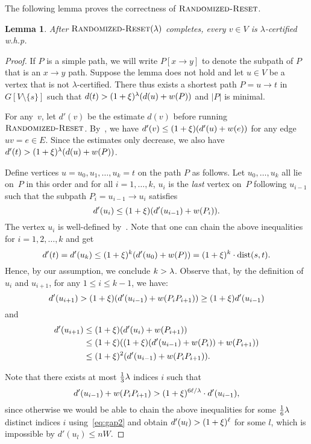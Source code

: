 \documentclass[11pt,letterpaper]{article}
\theoremstyle{plain}
\newtheorem{lemma}[theorem]{Lemma}
\newcommand{\dist}{\mathrm{dist}}
\newcommand{\wei}{w}
\begin{document}
The following lemma proves the correctness of $\textsc{Randomized-Reset}$.
\begin{lemma}\label{l:batch-insert-correct}
  After $\textsc{Randomized-Reset}(\lambda)$ completes, every $v\in V$ is $\lambda$-certified
  w.h.p.
\end{lemma}

\begin{proof}
If $P$ is a simple path, we will write $P[x\to y]$ to denote the subpath of $P$ that is an $x\to y$ path.
  Suppose the lemma does not hold and let $u\in V$ be a vertex that is not $\lambda$-certified.
  There thus exists a shortest path $P=u\to t$ in $G[V\setminus \{s\}]$ such that
  $d(t)>(1+\epsp)^\bal(d(u)+\wei(P))$ and $|P|$ is minimal.

  For any~$v$, let $d'(v)$ be the estimate $d(v)$ before running $\textsc{Randomized-Reset}$. 
  By~, we have $d'(v)\leq (1+\epsp)(d'(u)+\wei(e))$ for any edge $uv=e\in E$.
  Since the estimates only decrease, we also have $d'(t)>(1+\epsp)^\bal(d(u)+\wei(P))$.

  Define vertices $u=u_0,u_1,\ldots,u_k=t$ on the path $P$ as follows. Let $u_0,\ldots,u_k$
all lie on~$P$ in this order and for all $i=1,\ldots,k$, $u_i$ is the \emph{last} vertex on~$P$ following $u_{i-1}$ such that the subpath $P_i=u_{i-1}\to u_i$ satisfies
  \[ d'(u_i)\leq (1+\xi)(d'(u_{i-1})+w(P_i)). \]
The vertex $u_i$ is well-defined by~.
Note that one can chain the above inequalities for $i=1,2,\ldots,k$ and get
  \[d'(t)=d'(u_k)\leq (1+\epsp)^k(d'(u_0)+w(P))=(1+\epsp)^k\cdot \dist(s,t).\]
  Hence, by our assumption, we conclude $k>\lambda$.
  Observe that, by the definition of $u_{i}$ and $u_{i+1}$, for any $1\leq i\leq k-1$, we have:
  \begin{equation}\label{eq:gap2}
    d'(u_{i+1})>(1+\xi)(d'(u_{i-1})+w(P_iP_{i+1}))\geq (1+\xi)d'(u_{i-1})
  \end{equation}
  and
  \begin{align*}
    d'(u_{i+1})&\leq (1+\epsp)(d'(u_i)+\wei(P_{i+1}))\\
               &\leq (1+\epsp)((1+\epsp)(d'(u_{i-1})+\wei(P_{i}))+\wei(P_{i+1}))\\
               &\leq (1+\epsp)^2(d'(u_{i-1})+\wei(P_{i}P_{i+1})).
  \end{align*}

  Note that there exists at most $\frac{1}{3}\lambda$ indices $i$ such that
  \[ d'(u_{i-1})+\wei(P_iP_{i+1})>(1+\epsp)^{6\ell/\bal}\cdot d'(u_{i-1}), \]
  since otherwise we would be able to chain the above inequalities for some
  $\frac{1}{6}\lambda$ distinct indices $i$ using~\eqref{eq:gap2}
  and obtain $d'(u_l)>(1+\xi)^{\ell}$ for some $l$,
  which is impossible by $d'(u_l)\leq nW$.
  

\end{proof}
\end{document}
